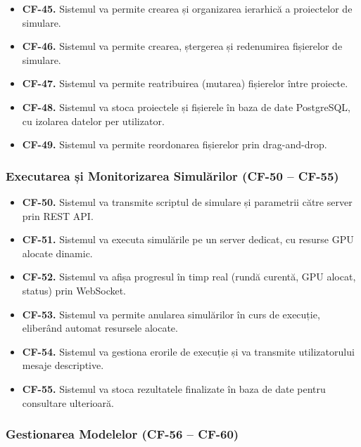 \documentclass[../../main.tex]{subfiles}
\begin{document}
        \begin{itemize}
            \item \textbf{CF-45.} Sistemul va permite crearea și organizarea ierarhică a proiectelor de simulare.
            \item \textbf{CF-46.} Sistemul va permite crearea, ștergerea și redenumirea fișierelor de simulare.
            \item \textbf{CF-47.} Sistemul va permite reatribuirea (mutarea) fișierelor între proiecte.
            \item \textbf{CF-48.} Sistemul va stoca proiectele și fișierele în baza de date PostgreSQL, cu izolarea datelor per utilizator.
            \item \textbf{CF-49.} Sistemul va permite reordonarea fișierelor prin drag-and-drop.
        \end{itemize}

        \subsubsection{Executarea și Monitorizarea Simulărilor (CF-50 -- CF-55)}

        \begin{itemize}
            \item \textbf{CF-50.} Sistemul va transmite scriptul de simulare și parametrii către server prin REST API.
            \item \textbf{CF-51.} Sistemul va executa simulările pe un server dedicat, cu resurse GPU alocate dinamic.
            \item \textbf{CF-52.} Sistemul va afișa progresul în timp real (rundă curentă, GPU alocat, status) prin WebSocket.
            \item \textbf{CF-53.} Sistemul va permite anularea simulărilor în curs de execuție, eliberând automat resursele alocate.
            \item \textbf{CF-54.} Sistemul va gestiona erorile de execuție și va transmite utilizatorului mesaje descriptive.
            \item \textbf{CF-55.} Sistemul va stoca rezultatele finalizate în baza de date pentru consultare ulterioară.
        \end{itemize}

        \subsubsection{Gestionarea Modelelor (CF-56 -- CF-60)}
\end{document}
